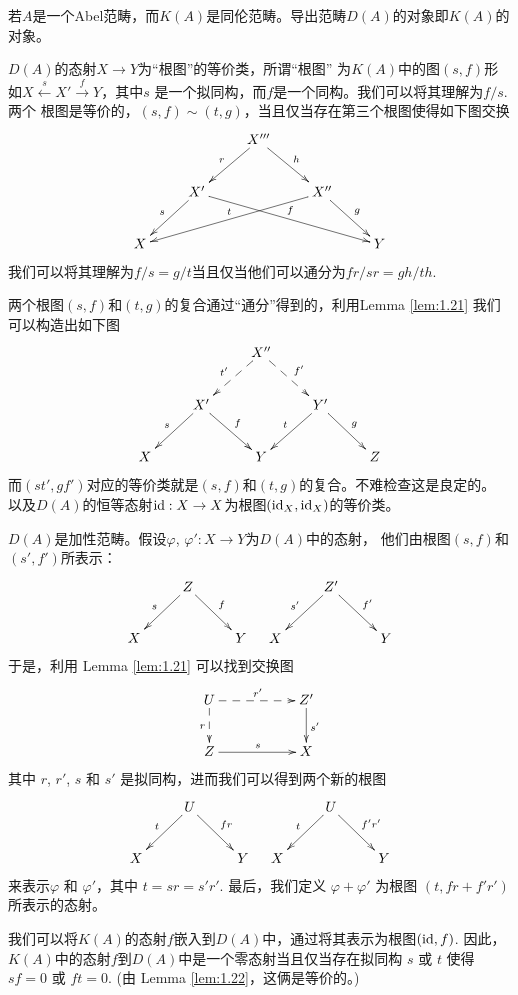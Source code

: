 \begin{para}[导出范畴的一种实现]
	若$A$是一个Abel范畴，而$K(A)$是同伦范畴。导出范畴$D(A)$的对象即$K(A)$的对象。
	\begin{compactenum}[\quad (1)]
		\item $D(A)$的态射$X\to Y$为“根图”的等价类，所谓“根图”
        为$K(A)$中的图$(s,f)$形如$X\xleftarrow{s}X'\xrightarrow{f}Y$，其中$s$
        是一个拟同构，而$f$是一个同构。我们可以将其理解为$f/s$. 两个
		根图是等价的，$(s,f)\sim (t,g)$，当且仅当存在第三个根图使得如下图交换
		\[
			\xymatrix{
				&  & X''' \ar@{->}[rd]^{h} \ar@{->}[ld]_{r} &  &  \\
				& X' \ar@{->}[ld]_{s} \ar@{->}[rrrd]^{f} &  & X'' \ar@{->}[rd]^{g} \ar@{->}[llld]_{t} &  \\
				X &  &  &  & Y
			}
		\]
        我们可以将其理解为$f/s=g/t$当且仅当他们可以通分为$fr/sr=gh/th$.
		\item 两个根图$(s,f)$和$(t,g)$的复合通过“通分”得到的，利用Lemma \ref{lem:1.21}
		我们可以构造出如下图
		\[
			\xymatrix{
			 &  & X'' \ar@{-->}[ld]_{t'} \ar@{-->}[rd]^{f'} &  &  \\
			 & X' \ar@{->}[ld]_{s} \ar@{->}[rd]^{f} &  & Y' \ar@{->}[ld]_{t} \ar@{->}[rd]^{g} &  \\
			X &  & Y &  & Z
			}
		\]
        而$(st',gf')$对应的等价类就是$(s,f)$和$(t,g)$的复合。不难检查这是良定的。
        以及$D(A)$的恒等态射$\operatorname{id}:X\to X$为根图$(\operatorname{id}_X,\operatorname{id}_X)$的等价类。
		\item $D(A)$是加性范畴。假设$\varphi$, $\varphi':X\to Y$为$D(A)$中的态射，
        他们由根图$(s,f)$和$(s',f')$所表示：
		\[
			\xymatrix{
				& Z \ar@{->}[ld]_{s} \ar@{->}[rd]^{f} &  \\
				X &  & Y
				}
			\quad
			\xymatrix{
				& Z' \ar@{->}[ld]_{s'} \ar@{->}[rd]^{f'} &  \\
				X &  & Y
			}
		\]
		于是，利用 Lemma \ref{lem:1.21} 可以找到交换图
		\[
			\xymatrix{
				U \ar@{-->}[rr]^{r'} \ar@{-->}[d]_{r} &  & Z' \ar@{->}[d]^{s'} \\
				Z \ar@{->}[rr]^{s} &  & X
				}
		\]
		其中 $r$, $r'$, $s$ 和 $s'$ 是拟同构，进而我们可以得到两个新的根图
		\[
			\xymatrix{
				& U \ar@{->}[ld]_{t} \ar@{->}[rd]^{fr} &  \\
				X &  & Y
				}
			\quad 
			\xymatrix{
				& U \ar@{->}[ld]_{t} \ar@{->}[rd]^{f'r'} &  \\
				X &  & Y
				}
		\]
		来表示$\varphi$ 和 $\varphi'$，其中 $t=sr=s'r'$. 最后，我们定义 $\varphi+\varphi'$ 
        为根图 $(t,fr+f'r')$ 所表示的态射。
	\item 我们可以将$K(A)$的态射$f$嵌入到$D(A)$中，通过将其表示为根图$(\operatorname{id},f)$. 
    因此，$K(A)$中的态射$f$到$D(A)$中是一个零态射当且仅当存在拟同构 $s$ 或 $t$ 
    使得$sf=0$ 或 $ft=0$. (由 Lemma \ref{lem:1.22}，这俩是等价的。)
	\end{compactenum}
\end{para}

